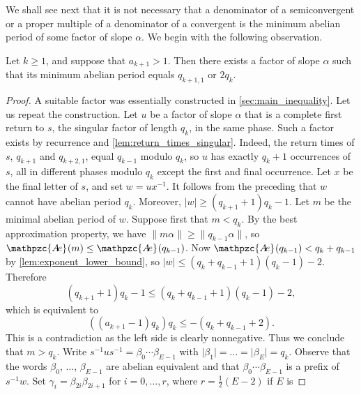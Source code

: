 \documentclass[a4paper,fleqn]{article}
\providecommand{\abs}[1]{\lvert#1\rvert}
\providecommand{\norm}[1]{\lVert#1\rVert}
\newcommand{\abexp}[2][]{\mathpzc{A\mkern-3mu e}_{#1}(#2)}
\begin{document}
  We shall see next that it is not necessary that a denominator of a semiconvergent or a proper multiple of a denominator
  of a convergent is the minimum abelian period of some factor of slope $\alpha$. We begin with the following
  observation.

  \begin{proposition}\label{prp:fibonacci_counter_example}
    Let $k \geq 1$, and suppose that $a_{k+1} > 1$. Then there exists a factor of slope $\alpha$ such that its minimum
    abelian period equals $q_{k+1,1}$ or $2q_k$.
  \end{proposition}
  \begin{proof}
    A suitable factor was essentially constructed in \autoref{sec:main_inequality}. Let us repeat the construction.
    Let $u$ be a factor of slope $\alpha$ that is a complete first return to $s$, the singular factor of length $q_k$,
    in the same phase. Such a factor exists by recurrence and \autoref{lem:return_times_singular}. Indeed, the return
    times of $s$, $q_{k+1}$ and $q_{k+2,1}$, equal $q_{k-1}$ modulo $q_k$, so $u$ has exactly $q_k + 1$ occurrences of
    $s$, all in different phases modulo $q_k$ except the first and final occurrence. Let $x$ be the final letter of
    $s$, and set $w = ux^{-1}$. It follows from the preceding that $w$ cannot have abelian period $q_k$. Moreover,
    $\abs{w} \geq (q_{k+1} + 1)q_k - 1$. Let $m$ be the minimal abelian period of $w$. Suppose first that $m < q_k$. By
    the best approximation property, we have $\norm{m\alpha} \geq \norm{q_{k-1}\alpha}$, so
    $\abexp{m} \leq \abexp{q_{k-1}}$. Now $\abexp{q_{k-1}} < q_k + q_{k-1}$ by \autoref{lem:exponent_lower_bound}, so
    $\abs{w} \leq (q_k + q_{k-1} + 1)(q_k - 1) - 2$. Therefore
    \begin{equation*}
      (q_{k+1} + 1)q_k - 1 \leq (q_k + q_{k-1} + 1)(q_k - 1) - 2,
    \end{equation*}
    which is equivalent to
    \begin{equation*}
      ((a_{k+1} - 1)q_k)q_k \leq -(q_k + q_{k-1} + 2).
    \end{equation*}
    This is a contradiction as the left side is clearly nonnegative. Thus we conclude that $m > q_k$. Write
    $s^{-1}us^{-1} = \beta_0 \dotsm \beta_{E-1}$ with $\abs{\beta_1} = \ldots = \abs{\beta_E} = q_k$. Observe that the
    words $\beta_0$, $\ldots$, $\beta_{E-1}$ are abelian equivalent and that $\beta_0 \dotsm \beta_{E-1}$ is a prefix
    of $s^{-1}w$. Set $\gamma_i = \beta_{2i}\beta_{2i+1}$ for $i = 0, \ldots, r$, where $r = \tfrac12(E - 2)$ if $E$ is

\end{proof}
\end{document}
